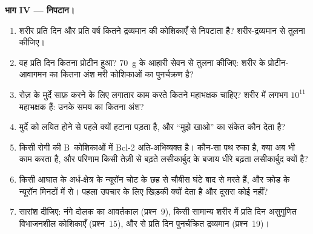 \begin{problem}
\medskip
\noindent\textbf{भाग IV --- निपटान।}
\begin{enumerate}[resume]
  \item शरीर प्रति दिन और प्रति वर्ष कितने द्रव्यमान की कोशिकाएँ
         से निपटाता है? शरीर-द्रव्यमान से तुलना कीजिए।
  \item वह प्रति दिन कितना प्रोटीन हुआ? \qty{70}{g} के आहारी सेवन से
        तुलना कीजिए: शरीर के प्रोटीन-आवागमन का कितना अंश मरी कोशिकाओं
        का पुनर्चक्रण है?
  \item रोज़ के मुर्दे साफ़ करने के लिए लगातार काम करते कितने महाभक्षक
        चाहिए? शरीर में लगभग $10^{11}$ महाभक्षक हैं: उनके समय का कितना
        अंश?
  \item मुर्दे को लयित होने से पहले क्यों हटाना पड़ता है, और ``मुझे
        खाओ'' का संकेत कौन देता है?
  \item किसी रोगी की B~कोशिकाओं में Bcl-2 अति-अभिव्यक्त है। कौन-सा पथ
        रुका है, क्या  अब भी काम करता है, और परिणाम किसी तेज़ी
        से बढ़ते लसीकार्बुद के बजाय धीरे बढ़ता लसीकार्बुद क्यों है?
  \item किसी आघात के अर्ध-क्षेत्र के न्यूरॉन चोट के छह से चौबीस घंटे
        बाद  से मरते हैं, और क्रोड के न्यूरॉन मिनटों में
         से। पहला उपचार के लिए खिड़की क्यों देता है और दूसरा कोई
        नहीं?
  \item सारांश दीजिए: नंगे दोलक का आवर्तकाल (प्रश्न~9), किसी सामान्य
        शरीर में प्रति दिन असुगुणित विभाजनशील कोशिकाएँ
        (प्रश्न~15), और  से प्रति दिन पुनर्चक्रित द्रव्यमान
        (प्रश्न~19)।
\end{enumerate}
\end{problem}
